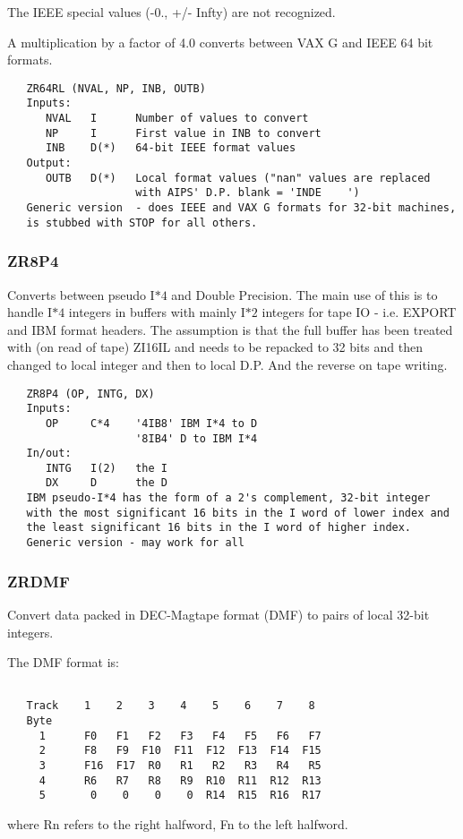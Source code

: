 The IEEE special values (-0., +/- Infty) are not recognized.

A multiplication by a factor of 4.0 converts between VAX G and IEEE
64 bit formats.
\begin{verbatim}
   ZR64RL (NVAL, NP, INB, OUTB)
   Inputs:
      NVAL   I      Number of values to convert
      NP     I      First value in INB to convert
      INB    D(*)   64-bit IEEE format values
   Output:
      OUTB   D(*)   Local format values ("nan" values are replaced
                    with AIPS' D.P. blank = 'INDE    ')
   Generic version  - does IEEE and VAX G formats for 32-bit machines,
   is stubbed with STOP for all others.
\end{verbatim}

\subsubsection{ZR8P4}
Converts between pseudo I$\ast4$ and Double Precision.  The main
use of this is to handle I$\ast4$ integers in buffers with mainly
I$\ast2$ integers for tape IO - i.e. EXPORT and IBM format headers.
The assumption is that the full buffer has been treated with (on read
of tape) ZI16IL and needs to be repacked to 32 bits and then changed
to local integer and then to local D.P.  And the reverse on tape
writing.
\begin{verbatim}
   ZR8P4 (OP, INTG, DX)
   Inputs:
      OP     C*4    '4IB8' IBM I*4 to D
                    '8IB4' D to IBM I*4
   In/out:
      INTG   I(2)   the I
      DX     D      the D
   IBM pseudo-I*4 has the form of a 2's complement, 32-bit integer
   with the most significant 16 bits in the I word of lower index and
   the least significant 16 bits in the I word of higher index.
   Generic version - may work for all
\end{verbatim}

\subsubsection{ZRDMF}
Convert data packed in DEC-Magtape format (DMF) to pairs of local
32-bit integers.

The DMF format is:
\begin{verbatim}

   Track    1    2    3    4    5    6    7    8
   Byte
     1      F0   F1   F2   F3   F4   F5   F6   F7
     2      F8   F9  F10  F11  F12  F13  F14  F15
     3      F16  F17  R0   R1   R2   R3   R4   R5
     4      R6   R7   R8   R9  R10  R11  R12  R13
     5       0    0    0    0  R14  R15  R16  R17
\end{verbatim}
where Rn refers to the right halfword, Fn to the left halfword.

